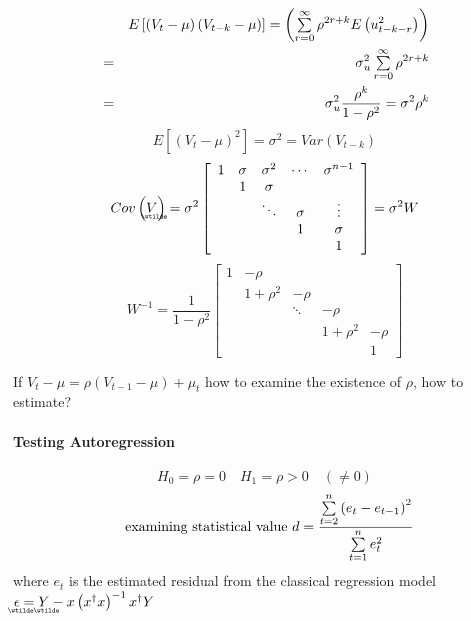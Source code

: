 \documentclass{article}
\begin{document}
\begin{eqnarray*}
&\therefore &E\left[ \left( V_{t}-\mu \right) \left( V_{t-k}-\mu \right) %
\right] =\left( \tsum\limits_{r=0}^{\infty }\rho ^{2r+k}E\left(
u_{t-k-r}^{2}\right) \right) \\
&=&\sigma _{u}^{2}\tsum\limits_{r=0}^{\infty }\rho ^{2r+k} \\
&=&\sigma _{u}^{2}\frac{\rho ^{k}}{1-\rho ^{2}}=\sigma ^{2}\rho ^{k}
\end{eqnarray*}%
\begin{equation*}
E\left[ \left( V_{t}-\mu \right) ^{2}\right] =\sigma ^{2}=Var\left(
V_{t-k}\right)
\end{equation*}%
\begin{equation*}
Cov\left( 
\underaccent{\wtilde}{V}%
\right) =\sigma ^{2}\left[ 
\begin{array}{ccccc}
1 & \sigma & \sigma ^{2} & \cdots & \sigma ^{n-1} \\ 
& 1 & \sigma &  &  \\ 
&  & \ddots & \sigma & \vdots \\ 
&  &  & 1 & \sigma \\ 
&  &  &  & 1%
\end{array}%
\right] =\sigma ^{2}W
\end{equation*}%
\begin{equation*}
W^{-1}=\frac{1}{1-\rho ^{2}}\left[ 
\begin{array}{ccccc}
1 & -\rho &  &  &  \\ 
& 1+\rho ^{2} & -\rho &  &  \\ 
&  & \ddots & -\rho &  \\ 
&  &  & 1+\rho ^{2} & -\rho \\ 
&  &  &  & 1%
\end{array}%
\right]
\end{equation*}

If $V_{t}-\mu =\rho \left( V_{t-1}-\mu \right) +\mu _{t}$ how to examine the
existence of $\rho $, how to estimate?

\bigskip

\paragraph{Testing Autoregression}

\begin{equation*}
H_{0}=\rho =0\quad H_{1}=\rho >0\quad \left( \neq 0\right) 
\end{equation*}%
\begin{equation*}
\text{examining statistical value }d=\frac{\tsum\limits_{t=2}^{n}\left(
e_{t}-e_{t-1}\right) ^{2}}{\tsum\limits_{t=1}^{n}e_{t}^{2}}
\end{equation*}%
where $e_{t}$ is the estimated residual from the classical regression model $%
\underaccent{\wtilde}{\epsilon}%
=%
\underaccent{\wtilde}{Y}%
-x\left( x^{\dagger }x\right) ^{-1}x^{\dagger }Y$
\end{document}
